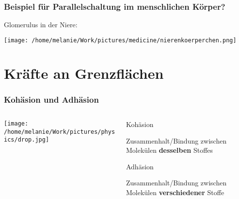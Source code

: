 \documentclass{beamer}
\begin{document}
\begin{frame}
\frametitle{Beispiel für Parallelschaltung im menschlichen Körper?}

\pause

Glomerulus in der Niere:

\begin{center}
\texttt{[image: /home/melanie/Work/pictures/medicine/nierenkoerperchen.png]}
\end{center}


\end{frame}





\section{Kräfte an Grenzflächen}




\begin{frame}
\frametitle{Kohäsion und Adhäsion}

\begin{columns}[c]

\begin{column}{5cm}
\begin{center}
\texttt{[image: /home/melanie/Work/pictures/physics/drop.jpg]}
\end{center}

\end{column}

\begin{column}{5cm}

\begin{block}{Kohäsion}

Zusammenhalt/Bindung zwischen Molekülen \textbf{desselben} Stoffes

\end{block}

\begin{block}{Adhäsion}

Zusammenhalt/Bindung zwischen Molekülen \textbf{verschiedener} Stoffe

\end{block}

\end{column}

\end{columns}

\end{frame}
\end{document}
